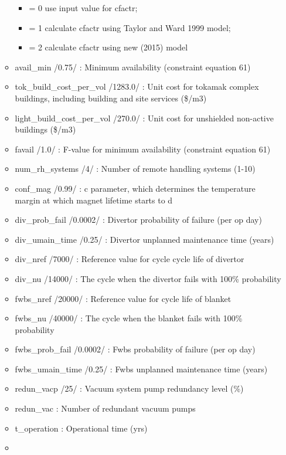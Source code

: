 \documentclass[]{article}
\providecommand{\tightlist}{%
  \setlength{\itemsep}{0pt}\setlength{\parskip}{0pt}}
\begin{document}
\begin{itemize}
\begin{itemize}
    \begin{itemize}
    \tightlist
    \item
      = 0 use input value for cfactr;
    \item
      = 1 calculate cfactr using Taylor and Ward 1999 model;
    \item
      = 2 calculate cfactr using new (2015) model
    \end{itemize}
  \item
    avail\_min /0.75/ : Minimum availability (constraint equation 61)
  \item
    tok\_build\_cost\_per\_vol /1283.0/ : Unit cost for tokamak complex
    buildings, including building and site services (\$/m3)
  \item
    light\_build\_cost\_per\_vol /270.0/ : Unit cost for unshielded
    non-active buildings (\$/m3)
  \item
    favail /1.0/ : F-value for minimum availability (constraint equation
    61)
  \item
    num\_rh\_systems /4/ : Number of remote handling systems (1-10)
  \item
    conf\_mag /0.99/ : c parameter, which determines the temperature
    margin at which magnet lifetime starts to d
  \item
    div\_prob\_fail /0.0002/ : Divertor probability of failure (per op
    day)
  \item
    div\_umain\_time /0.25/ : Divertor unplanned maintenance time
    (years)
  \item
    div\_nref /7000/ : Reference value for cycle cycle life of divertor
  \item
    div\_nu /14000/ : The cycle when the divertor fails with 100\%
    probability
  \item
    fwbs\_nref /20000/ : Reference value for cycle life of blanket
  \item
    fwbs\_nu /40000/ : The cycle when the blanket fails with 100\%
    probability
  \item
    fwbs\_prob\_fail /0.0002/ : Fwbs probability of failure (per op day)
  \item
    fwbs\_umain\_time /0.25/ : Fwbs unplanned maintenance time (years)
  \item
    redun\_vacp /25/ : Vacuum system pump redundancy level (\%)
  \item
    redun\_vac : Number of redundant vacuum pumps
  \item
    t\_operation : Operational time (yrs)
  \item

\end{itemize}
\end{itemize}
\end{document}
